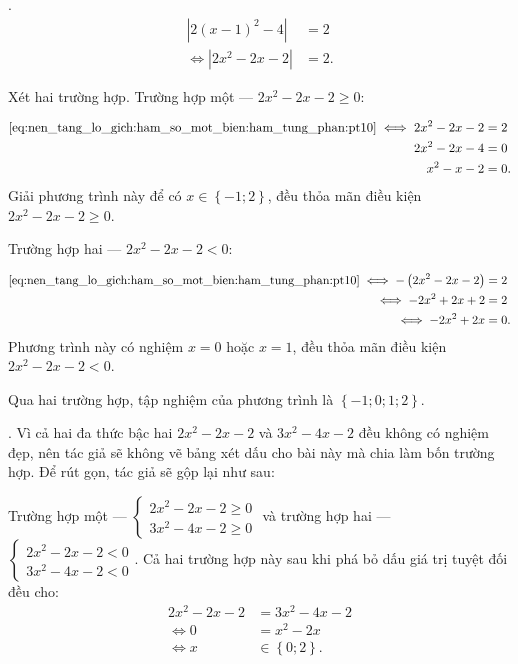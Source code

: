 .
\begin{align}
   \left|2(x - 1)^2 - 4\right| &= 2 \nonumber\\
   \iff \left|2x^2 - 2x - 2\right| &= 2. \label{eq:nen_tang_lo_gich:ham_so_mot_bien:ham_tung_phan:pt10}
\end{align}

Xét hai trường hợp. \textcolor{colorEmphasisCyan}{Trường hợp một --- $2x^2 - 2x - 2 \geq 0$}:

\begin{align*}
   \text{\eqref{eq:nen_tang_lo_gich:ham_so_mot_bien:ham_tung_phan:pt10}} \iff 2x^2 - 2x - 2 &= 2 \\
   2x^2 - 2x - 4 &= 0 \\
   x^2 - x - 2 &= 0.
\end{align*}
Giải phương trình này để có $x\in\left\{-1; 2\right\}$, đều thỏa mãn điều kiện $2x^2 - 2x - 2 \geq 0$.

\textcolor{colorEmphasis}{Trường hợp hai --- $2x^2 - 2x - 2 < 0$}:

\begin{align*}
   \text{\eqref{eq:nen_tang_lo_gich:ham_so_mot_bien:ham_tung_phan:pt10}} \iff -\left(2x^2 - 2x - 2\right) &= 2 \\
   \iff -2x^2 + 2x + 2 &= 2 \\
   \iff -2x^2 + 2x &= 0.
\end{align*}
Phương trình này có nghiệm $x = 0$ hoặc $x = 1$, đều thỏa mãn điều kiện $2x^2 - 2x - 2 < 0$.

Qua hai trường hợp, tập nghiệm của phương trình là $\left\{-1; 0; 1; 2\right\}$.

. Vì cả hai đa thức bậc hai $2x^2 -2x - 2$ và $3x^2 - 4x - 2$ đều không có nghiệm đẹp, nên tác giả sẽ không vẽ bảng xét dấu cho bài này mà chia làm bốn trường hợp. Để rút gọn, tác giả sẽ gộp lại như sau:

\textcolor{colorEmphasisCyan}{Trường hợp một --- $
\begin{cases}
   2x^2 - 2x - 2 \geq 0 \\
   3x^2 - 4x - 2 \geq 0
\end{cases}$} và \textcolor{colorEmphasisCyan}{trường hợp hai --- $
\begin{cases}
   2x^2 - 2x - 2 < 0 \\
   3x^2 - 4x - 2 < 0
\end{cases}$}. Cả hai trường hợp này sau khi phá bỏ dấu giá trị tuyệt đối đều cho:
\begin{align*}
   2x^2 - 2x - 2 &= 3x^2 - 4x - 2 \\
   \iff 0 &= x^2 - 2x \\
   \iff x &\in \left\{0; 2\right\}.
\end{align*}

